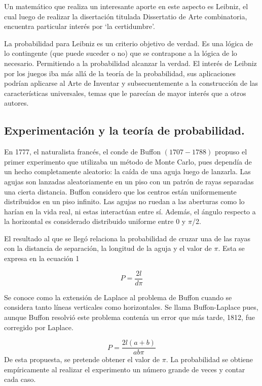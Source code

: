 \documentclass{rbf}
\begin{document}
Un matemático que realiza un interesante aporte en este aspecto es Leibniz, el cual luego de realizar la disertación titulada Dissertatio de Arte combinatoria, encuentra particular interés por ‘la certidumbre’.

La probabilidad para Leibniz es un criterio objetivo de verdad. Es una lógica de lo contingente (que puede suceder o no) que se contrapone a la lógica de lo necesario. Permitiendo a la probabilidad alcanzar la verdad. El interés de Leibniz por los juegos iba más allá de la teoría de la probabilidad, sus aplicaciones podrían aplicarse al Arte de Inventar y subsecuentemente a la construcción de las características universales, temas que le parecían de mayor interés que a otros autores.\cite{Charles}
\subsection{Experimentación y la teoría de probabilidad.}
En 1777, el naturalista francés, el conde de Buffon $(1707-1788)$ propuso el primer experimento que utilizaba un método de Monte Carlo, pues dependía de un hecho completamente aleatorio: la caída de una aguja luego de lanzarla. Las agujas son lanzadas aleatoriamente en un piso con un patrón de rayas separadas una cierta distancia. Buffon considero que los centros están uniformemente distribuidos en un piso infinito. Las agujas no ruedan a las aberturas como lo harían en la vida real, ni estas interactúan entre sí. Además, el ángulo respecto a la horizontal es considerado distribuido uniforme entre 0 y $\pi$/2.

El resultado al que se llegó relaciona la probabilidad de cruzar una de las rayas con la distancia de separación, la longitud de la aguja y el valor de $\pi$. Esta se expresa en la ecuación 1

\begin{equation}
    P=\frac{2l}{d\pi}
\end{equation}

Se conoce como la extensión de Laplace al problema de Buffon cuando se considera tanto líneas verticales como horizontales. Se llama Buffon-Laplace pues, aunque Buffon resolvió este problema contenía un error que más tarde, 1812, fue corregido por Laplace.

\begin{equation}
    P=\frac{2l(a+b)}{ab\pi}
\end{equation}
De esta propuesta, se pretende obtener el valor de $\pi$. La probabilidad se obtiene empíricamente al realizar el experimento un número grande de veces y contar cada caso.
\end{document}
